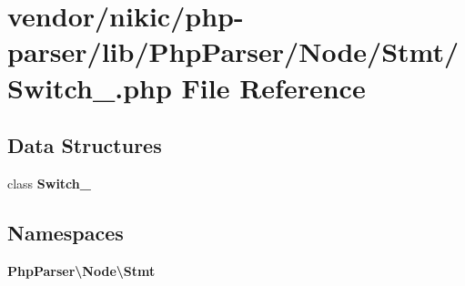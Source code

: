 \section{vendor/nikic/php-\/parser/lib/\+Php\+Parser/\+Node/\+Stmt/\+Switch\+\_\+.php File Reference}
\label{_switch___8php}
\subsection*{Data Structures}
\begin{DoxyCompactItemize}
\item 
class {\bf Switch\+\_\+}
\end{DoxyCompactItemize}
\subsection*{Namespaces}
\begin{DoxyCompactItemize}
\item 
 {\bf Php\+Parser\textbackslash{}\+Node\textbackslash{}\+Stmt}
\end{DoxyCompactItemize}
